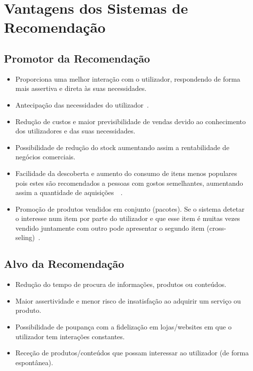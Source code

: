 
\section{Vantagens dos Sistemas de Recomendação}
\subsection{Promotor da Recomendação}
\begin{itemize}
\item Proporciona uma melhor interação com o utilizador, respondendo de forma mais assertiva e direta às suas necessidades.
\item Antecipação das necessidades do utilizador~\cite{ref_book2}.
\item Redução de custos e maior previsibilidade de vendas devido ao conhecimento dos utilizadores e das suas necessidades.
\item Possibilidade de redução do stock aumentando assim a rentabilidade de negócios comerciais.
\item Facilidade da descoberta e aumento do consumo de itens menos populares pois estes são recomendados a pessoas com gostos semelhantes, aumentando assim a quantidade de aquisições~\cite{ref_book2}~\cite{ref_article1}.
\item Promoção de produtos vendidos em conjunto (pacotes). Se o sistema detetar o interesse num item por parte do utilizador e que esse item é muitas vezes vendido juntamente com outro pode apresentar o segundo item (cross-seling)~\cite{ref_book2}.
\end{itemize}


\subsection{Alvo da Recomendação}
\begin{itemize}
\item Redução do tempo de procura de informações, produtos ou conteúdos.
\item Maior assertividade e menor risco de insatisfação ao adquirir um serviço ou produto.
\item Possibilidade de poupança com a fidelização em lojas/websites em que o utilizador tem interações constantes.
\item Receção de produtos/conteúdos que possam interessar ao utilizador (de forma espontânea).
\end{itemize}

